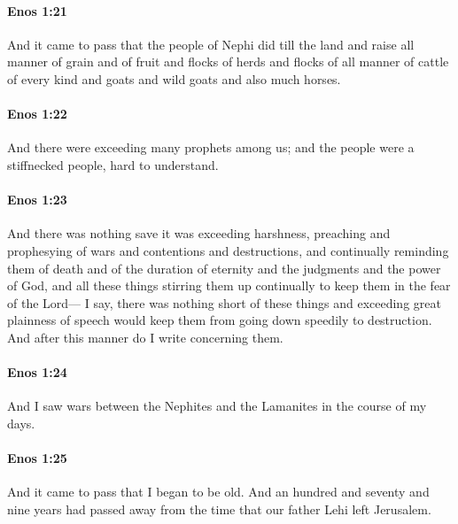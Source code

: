 		\paragraph{Enos 1:21} %
			\label{ENOS-1-21}

			And it came to pass that the people of Nephi did till the land
			and raise all manner of grain and of fruit
			and flocks of herds and flocks of all manner of cattle of every kind
			and goats and wild goats and also much horses.

		\paragraph{Enos 1:22} %
			\label{ENOS-1-22}

			And there were exceeding many prophets among us;
			and the people were a stiffnecked people,
			hard to understand.

		\paragraph{Enos 1:23} %
			\label{ENOS-1-23}

			And there was nothing save it was exceeding harshness,
			preaching and prophesying of wars and contentions and destructions,
			and continually reminding them of death
			and of the duration of eternity and the judgments and the power of God,
			and all these things stirring them up continually
			to keep them in the fear of the Lord---
			I say, there was nothing short of these things
			and exceeding great plainness of speech
			would keep them from going down speedily to destruction.
			And after this manner do I write concerning them.

		\paragraph{Enos 1:24} %
			\label{ENOS-1-24}

			And I saw wars between the Nephites and the Lamanites in the course of my days.

		\paragraph{Enos 1:25} %
			\label{ENOS-1-25}

			And it came to pass that I began to be old.
			And an hundred and seventy and nine years had passed away
			from the time that our father Lehi left Jerusalem.

